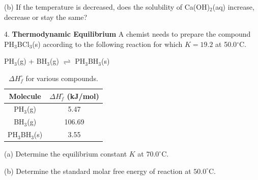 \documentclass[10pt]{article}
\begin{document}
(b) If the temperature is decreased, does the solubility of Ca(OH)$_2$(aq) increase,
decrease or stay the same?

4. \textbf{Thermodynamic Equilibrium} A chemist needs to prepare the compound PH$_3$BCl$_3$(s)
according to the following reaction for which $K = 19.2$ at 50.0$^\circ$C.

\begin{center}
  PH$_3$(g) + BH$_3$(g) $\rightleftharpoons$ PH$_3$BH$_3$(s)
\end{center}

\begin{table}[hbpt]
  \centering
  \begin{tabular}{c|c}
    Molecule & $\Delta H^\circ_f$ (kJ/mol) \\
    \hline
    PH$_3$(g) & 5.47   \\
    BH$_3$(g) & 106.69 \\
    PH$_3$BH$_3$(s) & 3.55
  \end{tabular}
  \caption{$\Delta H^\circ_f$ for various compounds.}
\end{table}

(a) Determine the equilibrium constant $K$ at $70.0^\circ$C.

(b) Determine the standard molar free energy of reaction at $50.0^\circ$C.
\end{document}
